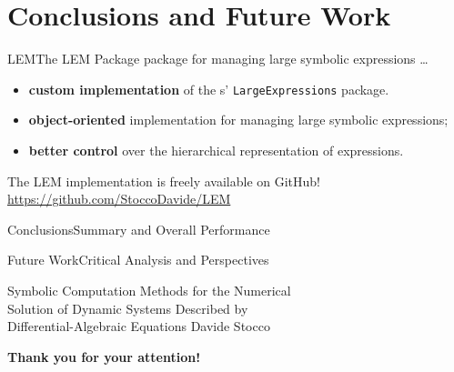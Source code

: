 
\section{Conclusions and Future Work}

\begin{frame}{\acl{LEM}}{The \ac{LEM} Package}
  \Maple{} package for managing large symbolic expressions \dots
  \begin{itemize}
    \item \textbf{custom implementation} of the \Maple{}s' \texttt{LargeExpressions} package.
    \item \textbf{object-oriented} implementation for managing large symbolic expressions;
    \item \textbf{better control} over the hierarchical representation of expressions.
  \end{itemize}
  \begin{bbox}
    The LEM implementation is freely available on GitHub! \\
    \centering \url{https://github.com/StoccoDavide/LEM}
  \end{bbox}
\end{frame}

\begin{frame}{Conclusions}{Summary and Overall Performance}

\end{frame}

\begin{frame}{Future Work}{Critical Analysis and Perspectives}
\end{frame}

\begin{frame}{%
  Symbolic Computation Methods for the Numerical \\
  Solution of Dynamic Systems Described by \\
  Differential-Algebraic Equations
  }{Davide Stocco}
  \vfill
  \raggedright{\selectfont\Huge\color{tx_sl_color}\bfseries{Thank you for your attention!}} \\[0.5em]
\end{frame}


